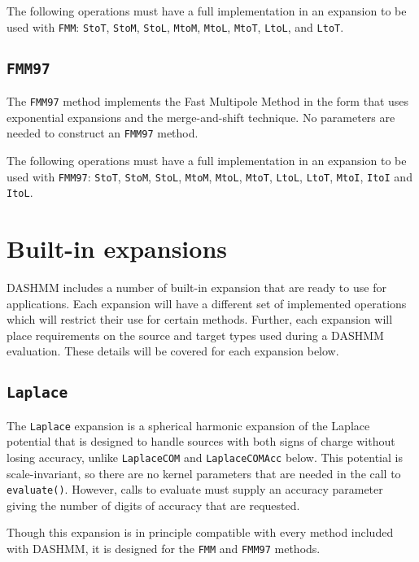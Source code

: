 The following operations must have a full implementation in an expansion to be
used with \texttt{FMM}: \texttt{StoT}, \texttt{StoM}, \texttt{StoL},
\texttt{MtoM}, \texttt{MtoL}, \texttt{MtoT}, \texttt{LtoL}, and \texttt{LtoT}.

\subsection{\texttt{FMM97}}

The \texttt{FMM97} method implements the Fast Multipole Method in the form that
uses exponential expansions and the merge-and-shift technique. No parameters
are needed to construct an \texttt{FMM97} method.

The following operations must have a full implementation in an expansion to be
used with \texttt{FMM97}: \texttt{StoT}, \texttt{StoM}, \texttt{StoL},
\texttt{MtoM}, \texttt{MtoL}, \texttt{MtoT}, \texttt{LtoL},
\texttt{LtoT}, \texttt{MtoI}, \texttt{ItoI} and \texttt{ItoL}.


\section{Built-in expansions}
\label{sec:bi-exp}

DASHMM includes a number of built-in expansion that are ready to use for
applications. Each expansion will have a different set of implemented
operations which will restrict their use for certain methods. Further, each
expansion will place requirements on the source and target types used during
a DASHMM evaluation. These details will be covered for each expansion
below.

\subsection{\texttt{Laplace}}

The \texttt{Laplace} expansion is a spherical harmonic expansion of the Laplace
potential that is designed to handle sources with both signs of charge without
losing accuracy, unlike \texttt{LaplaceCOM} and \texttt{LaplaceCOMAcc} below.
This potential is scale-invariant, so there are no kernel parameters that are
needed in the call to \texttt{evaluate()}. However, calls to evaluate must
supply an accuracy parameter giving the number of digits of accuracy that are
requested.

Though this expansion is in principle compatible with every method included
with DASHMM, it is designed for the \texttt{FMM} and \texttt{FMM97} methods.

